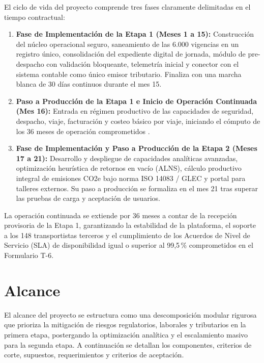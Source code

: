 El ciclo de vida del proyecto comprende tres fases claramente delimitadas en el tiempo contractual:

\begin{enumerate}
  \item \textbf{Fase de Implementación de la Etapa 1 (Meses 1 a 15):} Construcción del núcleo operacional
  seguro, saneamiento de las 6.000 vigencias en un registro único, consolidación del expediente digital de
  jornada, módulo de pre-despacho con validación bloqueante, telemetría inicial y conector con el sistema
  contable como único emisor tributario. Finaliza con una marcha blanca de 30 días continuos durante el mes 15.
  \item \textbf{Paso a Producción de la Etapa 1 e Inicio de Operación Continuada (Mes 16):} Entrada en
  régimen productivo de las capacidades de seguridad, despacho, viaje, facturación y costeo básico por viaje,
  iniciando el cómputo de los 36 meses de operación comprometidos .
  \item \textbf{Fase de Implementación y Paso a Producción de la Etapa 2 (Meses 17 a 21):} Desarrollo y
  despliegue de capacidades analíticas avanzadas, optimización heurística de retornos en vacío (ALNS),
  cálculo productivo integral de emisiones CO2e bajo norma ISO 14083 / GLEC y portal para talleres externos.
  Su paso a producción se formaliza en el mes 21 tras superar las pruebas de carga y aceptación de usuarios.
\end{enumerate}

La operación continuada se extiende por 36 meses a contar de la recepción provisoria de la Etapa 1,
garantizando la estabilidad de la plataforma, el soporte a los 148 transportistas terceros y el cumplimiento
de los Acuerdos de Nivel de Servicio (SLA) de disponibilidad igual o superior al 99,5\,\% comprometidos en el Formulario T-6.

\section{Alcance}\label{sec:3-alcance}

El alcance del proyecto se estructura como una descomposición modular rigurosa que prioriza la mitigación de
riesgos regulatorios, laborales y tributarios en la primera etapa, postergando la optimización analítica y
el escalamiento masivo para la segunda etapa. A continuación se detallan los componentes, criterios de corte,
supuestos, requerimientos y criterios de aceptación.

